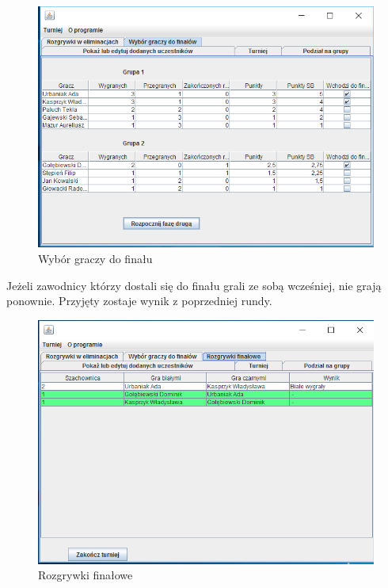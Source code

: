 \begin{figure}[H]
	\centering
	\includegraphics[width=15cm]{fig/15}
	\caption{Wybór graczy do finału}
	\label {fig:rozgrywka_finalowa_1} 
\end{figure}
Jeżeli zawodnicy którzy dostali się do finału grali ze sobą wcześniej, nie grają ponownie. Przyjęty zostaje wynik z poprzedniej rundy.
\begin{figure}[H]
	\centering
	\includegraphics[width=15cm]{fig/16}
	\caption{Rozgrywki finałowe}
	\label {fig:rozgrywka_finalowa_2} 
\end{figure}

